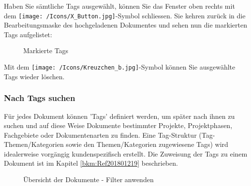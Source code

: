 Haben Sie sämtliche Tags ausgewählt, können Sie das Fenster oben rechts mit dem \texttt{[image: /Icons/X\_Button.jpg]}-Symbol schliessen. Sie kehren zurück in die Bearbeitungsmaske des hochgeladenen Dokumentes und sehen nun die markierten Tags aufgelistet:

\begin{figure}[H]
\caption{Markierte Tags}
\end{figure}

Mit dem \texttt{[image: /Icons/Kreuzchen\_b.jpg]}-Symbol  können Sie ausgewählte Tags wieder löschen.
 



\subsubsection{Nach Tags suchen}
\label{bkm:Ref442275849}

Für jedes Dokument können 'Tags' definiert werden, um später nach ihnen zu suchen und auf diese Weise Dokumente bestimmter Projekte, Projektphasen, Fachgebiete oder Dokumentenarten zu finden. Eine Tag-Struktur (Tag-Themen/Kategorien sowie den Themen/Kategorien zugewiesene Tags) wird idealerweise vorgängig kundenspezifisch erstellt. Die Zuweisung der Tags zu einem Dokument ist im Kapitel \ref{bkm:Ref201801219} beschrieben.

\begin{figure}[H]
\caption{Übersicht der Dokumente - Filter anwenden}
\end{figure}

